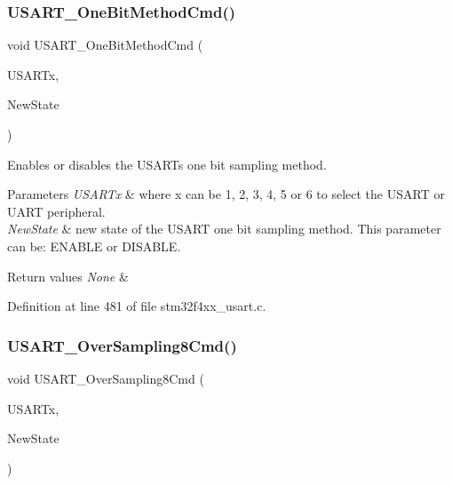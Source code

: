 \subsubsection{\texorpdfstring{U\+S\+A\+R\+T\+\_\+\+One\+Bit\+Method\+Cmd()}{USART\_OneBitMethodCmd()}}
{\footnotesize\ttfamily void U\+S\+A\+R\+T\+\_\+\+One\+Bit\+Method\+Cmd (\begin{DoxyParamCaption}\item[{\hyperlink{struct_u_s_a_r_t___type_def}{U\+S\+A\+R\+T\+\_\+\+Type\+Def} $\ast$}]{U\+S\+A\+R\+Tx,  }\item[{Functional\+State}]{New\+State }\end{DoxyParamCaption})}



Enables or disables the U\+S\+A\+RT\textquotesingle{}s one bit sampling method. 


\begin{DoxyParams}{Parameters}
{\em U\+S\+A\+R\+Tx} & where x can be 1, 2, 3, 4, 5 or 6 to select the U\+S\+A\+RT or U\+A\+RT peripheral. \\
\hline
{\em New\+State} & new state of the U\+S\+A\+RT one bit sampling method. This parameter can be\+: E\+N\+A\+B\+LE or D\+I\+S\+A\+B\+LE. \\
\hline
\end{DoxyParams}

\begin{DoxyRetVals}{Return values}
{\em None} & \\
\hline
\end{DoxyRetVals}


Definition at line 481 of file stm32f4xx\+\_\+usart.\+c.

\mbox{\label{group___u_s_a_r_t_ga3897bab07491d9239f8a238a9a7cddea}} 
\subsubsection{\texorpdfstring{U\+S\+A\+R\+T\+\_\+\+Over\+Sampling8\+Cmd()}{USART\_OverSampling8Cmd()}}
{\footnotesize\ttfamily void U\+S\+A\+R\+T\+\_\+\+Over\+Sampling8\+Cmd (\begin{DoxyParamCaption}\item[{\hyperlink{struct_u_s_a_r_t___type_def}{U\+S\+A\+R\+T\+\_\+\+Type\+Def} $\ast$}]{U\+S\+A\+R\+Tx,  }\item[{Functional\+State}]{New\+State }\end{DoxyParamCaption})}



